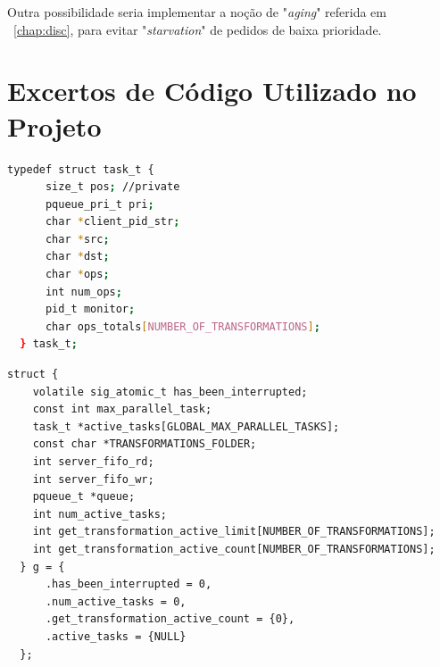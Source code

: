 \documentclass[11pt,a4paper]{report}%
\begin{document}
Outra possibilidade seria implementar a noção de "\textit{aging}" referida em ~\ref{chap:disc}, para evitar
"\textit{starvation}" de pedidos de baixa prioridade.

\appendix %
\chapter{Excertos de Código Utilizado no Projeto}


\label{code:task_struct}
\begin{lstlisting}[language=bash, caption={Estrutura para pedidos de processamento de ficheiros}]
    typedef struct task_t {
      size_t pos; //private
      pqueue_pri_t pri;
      char *client_pid_str;
      char *src;
      char *dst;
      char *ops;
      int num_ops;
      pid_t monitor;
      char ops_totals[NUMBER_OF_TRANSFORMATIONS];
  } task_t;
\end{lstlisting}

\label{code:server_struct}
\begin{lstlisting}[caption={Amostra de Estrutura global do servidor}]
  struct {
    volatile sig_atomic_t has_been_interrupted;
    const int max_parallel_task;
    task_t *active_tasks[GLOBAL_MAX_PARALLEL_TASKS];
    const char *TRANSFORMATIONS_FOLDER;
    int server_fifo_rd;
    int server_fifo_wr;
    pqueue_t *queue;
    int num_active_tasks;
    int get_transformation_active_limit[NUMBER_OF_TRANSFORMATIONS];
    int get_transformation_active_count[NUMBER_OF_TRANSFORMATIONS];
  } g = {
      .has_been_interrupted = 0,
      .num_active_tasks = 0,
      .get_transformation_active_count = {0},
      .active_tasks = {NULL}
  };
\end{lstlisting}

\end{document}
